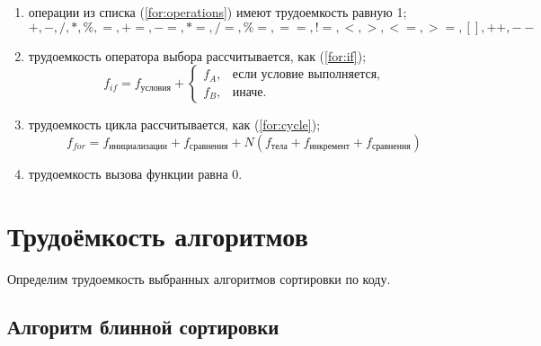 \begin{enumerate}
	\item операции из списка (\ref{for:operations}) имеют трудоемкость равную 1;
	\begin{equation}
		\label{for:operations}
		+, -, /, *, \%, =, +=, -=, *=, /=, \%=, ==, !=, <, >, <=, >=, [], ++, {-}-
	\end{equation}
	\item трудоемкость оператора выбора  рассчитывается, как (\ref{for:if});
	\begin{equation}
		\label{for:if}
		f_{if} = f_{\text{условия}} +
		\begin{cases}
			f_A, & \text{если условие выполняется,}\\
			f_B, & \text{иначе.}
		\end{cases}
	\end{equation}
	\item трудоемкость цикла рассчитывается, как (\ref{for:cycle});
	\begin{equation}
		\label{for:cycle}
		f_{for} = f_{\text{инициализации}} + f_{\text{сравнения}} + N(f_{\text{тела}} + f_{\text{инкремент}} + f_{\text{сравнения}})
	\end{equation}
	\item трудоемкость вызова функции равна 0.
\end{enumerate}


\section{Трудоёмкость алгоритмов}

Определим трудоемкость выбранных алгоритмов сортировки по коду.

\subsection{Алгоритм блинной сортировки}

